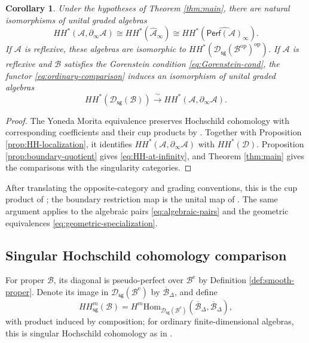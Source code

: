 \documentclass[11pt,letterpaper,reqno]{amsart}
\theoremstyle{plain}
\newtheorem{corollary}[corollary]{Corollary}
\theoremstyle{definition}
\theoremstyle{plain}
\theoremstyle{definition}
\numberwithin{equation}{section}
\begin{document}
\begin{corollary}\label{cor:HH-boundary}
Under the hypotheses of Theorem \ref{thm:main}, there are natural isomorphisms of unital graded algebras
\begin{equation}\label{eq:HH-at-infinity}
HH^*(\mathscr A,\partial_\infty\mathscr A)
\cong HH^*(\widehat{\mathscr A}_\infty)
\cong HH^*(\widehat{\mathsf{Perf}(\mathscr A)}_\infty).
\end{equation}
If $\mathscr A$ is reflexive, these algebras are isomorphic to $HH^*(\mathscr D_{\mathsf{sg}}(\mathscr B^{\mathrm{op}})^{\mathrm{op}})$.
If $\mathscr A$ is reflexive and $\mathscr B$ satisfies the Gorenstein condition \eqref{eq:Gorenstein-cond}, the functor \eqref{eq:ordinary-comparison} induces an isomorphism of unital graded algebras
\begin{equation}\label{eq:HH-singularity}
HH^*(\mathscr D_{\mathsf{sg}}(\mathscr B))
\xrightarrow{\;\sim\;}HH^*(\mathscr A,\partial_\infty\mathscr A).
\end{equation}
\end{corollary}
\begin{proof}
The Yoneda Morita equivalence preserves Hochschild cohomology with corresponding coefficients and their cup products by \cite[Proposition 3.10(e)]{Keller2011}.
Together with Proposition \ref{prop:HH-localization}, it identifies $HH^*(\mathscr A,\partial_\infty\mathscr A)$ with $HH^*(\mathscr D)$.
Proposition \ref{prop:boundary-quotient} gives \eqref{eq:HH-at-infinity}, and Theorem \ref{thm:main} gives the comparisons with the singularity categories.
\end{proof}

After translating the opposite-category and grading conventions, this is the cup product of \cite[Definition 4.2 and Remark 4.3]{Rivera-Takeda-Wang2024}; the boundary restriction map is the unital map of \cite[Proposition 3.10]{Gao2025}.
The same argument applies to the algebraic pairs \eqref{eq:algebraic-pairs} and the geometric equivalences \eqref{eq:geometric-specialization}.

\subsection{Singular Hochschild cohomology comparison}

For proper $\mathscr B$, its diagonal is pseudo-perfect over $\mathscr B^{\mathrm e}$ by Definition \ref{def:smooth-proper}.
Denote its image in $\mathscr D_{\mathsf{sg}}(\mathscr B^{\mathrm e})$ by $\overline{\mathscr B}_\Delta$, and define
\[
HH^m_{\mathsf{sg}}(\mathscr B)
=H^m\mathrm{Hom}_{\mathscr D_{\mathsf{sg}}(\mathscr B^{\mathrm e})}
(\overline{\mathscr B}_\Delta,\overline{\mathscr B}_\Delta),
\]
with product induced by composition; for ordinary finite-dimensional algebras, this is singular Hochschild cohomology as in \cite[Section 1]{Keller2020}.
\end{document}
